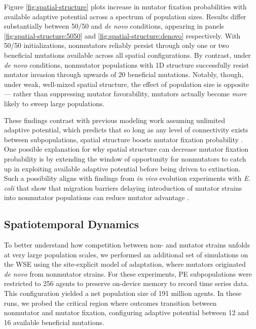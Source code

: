 

Figure \ref{fig:spatial-structure} plots increase in mutator fixation probabilities with available adaptive potential across a spectrum of population sizes.
Results differ substantially between 50/50 and \textit{de novo} conditions, appearing in panels \ref{fig:spatial-structure:5050} and \ref{fig:spatial-structure:denovo} respectively.
With 50/50 initializations, nonmutators reliably persist through only one or two beneficial mutations available across all spatial configurations.
By contrast, under \textit{de novo} conditions, nonmutator populations with 1D structure successfully resist mutator invasion through upwards of 20 beneficial mutations.
Notably, though, under weak, well-mixed spatial structure, the effect of population size is opposite --- rather than suppressing mutator favorability, mutators actually become \textit{more} likely to sweep large populations.

These findings contrast with previous modeling work assuming unlimited adaptive potential, which predicts that so long as any level of connectivity exists between subpopulations, spatial structure boosts mutator fixation probability \citep{raynes2019migration}.
One possible explanation for why spatial structure can decrease mutator fixation probability is by extending the window of opportunity for nonmutators to catch up in exploiting available adaptive potential before being driven to extinction.
Such a possibility aligns with findings from \textit{in vivo} evolution experiments with \textit{E. coli} that show that migration barriers delaying introduction of mutator strains into nonmutator populations can reduce mutator advantage \citep{lechat2006escherichia}.

\subsection{Spatiotemporal Dynamics}
\label{sec:dynamics}

To better understand how competition between non- and mutator strains unfolds at very large population scales, we performed an additional set of simulations on the WSE using the site-explicit model of adaptation, where mutators originated \textit{de novo} from nonmutator strains.
For these experiments, PE subpopulations were restricted to 256 agents to preserve on-device memory to record time series data.
This configuration yielded a net population size of 191 million agents.
In these runs, we probed the critical region where outcomes transition between nonmutator and mutator fixation, configuring adaptive potential between 12 and 16 available beneficial mutations.

